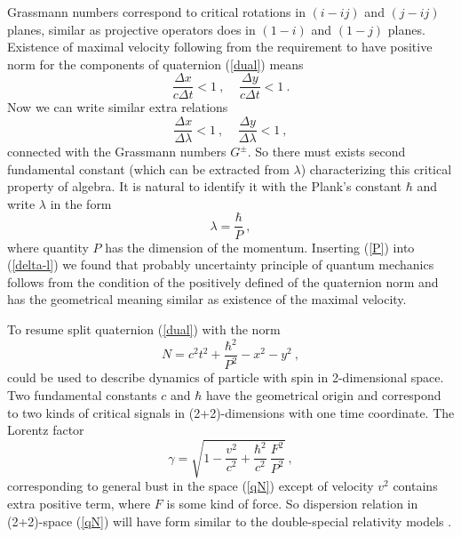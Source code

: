\documentclass[a4paper,12pt]{article}
\begin{document}
Grassmann numbers correspond to critical rotations in $(i-ij)$ and $(j-ij)$ planes, 
similar as projective operators does in $(1-i)$ and $(1-j)$ planes. Existence of 
maximal velocity following from the requirement to have positive norm for the components 
of quaternion (\ref{dual}) means
\begin{equation} \label{delta-x}
\frac{\Delta x}{c\Delta t} < 1 ~, ~~~~~ \frac{\Delta y}{c\Delta t} < 1 ~.
\end{equation}
Now we can write similar extra relations 
\begin{equation} \label{delta-l}
\frac{\Delta x}{\Delta \lambda} < 1 ~, ~~~~~
\frac{\Delta y}{\Delta \lambda} < 1 ~, 
\end{equation}
connected with the Grassmann numbers $G^\pm$. So there must exists second fundamental 
constant (which can be extracted from $\lambda$) characterizing this critical property 
of algebra. It is natural to identify it with the Plank's constant $\hbar$ and write 
$\lambda$ in the form
\begin{equation} \label{P}
\lambda = \frac{\hbar}{P} ~, 
\end{equation}
where quantity $P$ has the dimension of the momentum. Inserting (\ref{P}) into 
(\ref{delta-l}) we found that probably uncertainty principle of quantum mechanics follows 
from the condition of the positively defined of the quaternion norm and has the geometrical
meaning similar as existence of the maximal velocity. 

To resume split quaternion (\ref{dual}) with the norm
\begin{equation} \label{qN}
N = c^2t^2 + \frac{\hbar^2}{P^2} - x^2 - y^2 ~,
\end{equation}
could be used to describe dynamics of particle with spin in 2-dimensional space. Two 
fundamental constants $c$ and $\hbar$ have the geometrical origin and correspond to two 
kinds of critical signals in (2+2)-dimensions with one time coordinate. The Lorentz factor 
\begin{equation} \label{qLorentz}
\gamma = \sqrt{1 - \frac{v^2}{c^2} + \frac{\hbar^2}{c^2}~ \frac{F^2}{P^2} }~,
\end{equation}
corresponding to general bust in the space (\ref{qN}) except of velocity $v^2$ contains 
extra positive term, where $F$ is some kind of force. So dispersion relation in (2+2)-space 
(\ref{qN}) will have form similar to the double-special relativity models \cite{double}. 

\end{document}
